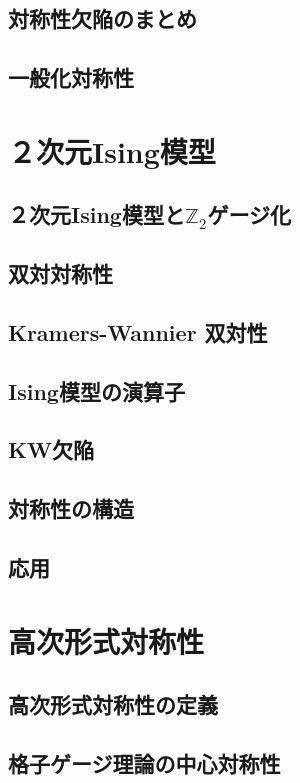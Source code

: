 \documentclass[report,paper=a4, fontsize=12pt, line_length=16cm, number_of_lines=33,dvipdfmx]{jlreq}
\numberwithin{equation}{chapter}
\newcommand{\Ztwo}{\mbox{$\mathbb{Z}_{2}$}}
\begin{document}
\section{対称性欠陥のまとめ}
\section{一般化対称性}



\chapter{２次元Ising模型}

\section{２次元Ising模型と\texorpdfstring{\Ztwo}{Z2}ゲージ化}
\section{双対対称性}
\section{Kramers-Wannier 双対性}
\section{Ising模型の演算子}
\section{KW欠陥}
\section{対称性の構造}
\section{応用}


\chapter{高次形式対称性}
\section{高次形式対称性の定義}
\section{格子ゲージ理論の中心対称性}
\end{document}
